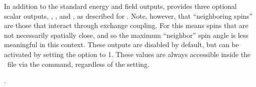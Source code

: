 \begin{description}
   In addition to the standard energy and field outputs,
    provides three optional scalar outputs,
   , , and
   , as described for
   . Note,
   however, that ``neighboring spins'' are those that interact through
   exchange coupling. For  this means spins
   that are not necessarily spatially close, and so the maximum
   ``neighbor'' spin angle is less meaningful in this context. These
   outputs are disabled by default, but can be activated by setting
   the  option to 1. These values are
   always accessible inside the \MIF\ file via
   the  command,
   regardless of the  setting.

\begin{ExampleMifs}[Example]
  .
\end{ExampleMifs}

\end{description}

